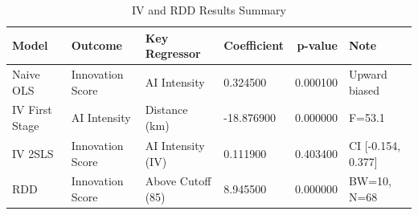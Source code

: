 \begin{table}[H]
\caption{IV and RDD Results Summary}
\label{tab:results}
\begin{tabular}{llllrl}
\toprule
Model & Outcome & Key Regressor & Coefficient & p-value & Note \\
\midrule
Naive OLS & Innovation Score & AI Intensity & 0.324500 & 0.000100 & Upward biased \\
IV First Stage & AI Intensity & Distance (km) & -18.876900 & 0.000000 & F=53.1 \\
IV 2SLS & Innovation Score & AI Intensity (IV) & 0.111900 & 0.403400 & CI [-0.154, 0.377] \\
RDD & Innovation Score & Above Cutoff (85) & 8.945500 & 0.000000 & BW=10, N=68 \\
\bottomrule
\end{tabular}
\end{table}
